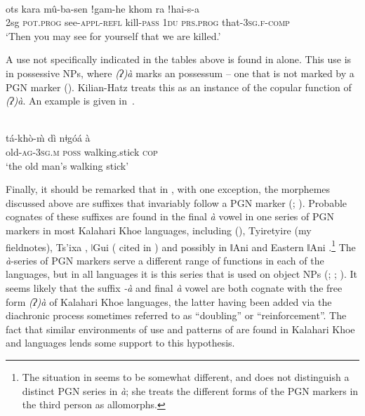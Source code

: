 \documentclass[output=paper]{LSP/langsci}
\begin{document}
\begin{exe}
\ex\label{09-mc-ex:18}
\\
\gll ots kara mû-ba-sen ǃgam-he khom ra ǃhai-s-a\\
2sg \textsc{pot}.\textsc{prog} see-\textsc{appl}-\textsc{refl} kill-\textsc{pass} 1\textsc{du} \textsc{prs}.\textsc{prog} that-3\textsc{sg.f}-\textsc{comp}\\
\glt ‘Then you may see for yourself that we are killed.’ 
\end{exe}

A use not specifically indicated in the tables above is found in  alone. This use is in possessive NPs, where \textit{(ʔ)à} marks an  possessum – \ie one that is not marked by a PGN marker (\citealt[70, 73]{Kilian-Hatz2008Grammar}). Kilian-Hatz treats this as an instance of the copular function of \textit{(ʔ)à}. An example is given in~.

\ea{}\\
\label{09-mc-ex:19} 
\gll tá-khò-\`{m} dì nǂgóá à\\
old-\textsc{ag}-3\textsc{sg.m} \textsc{poss} walking.stick \textsc{cop}\\
\glt ‘the old man’s walking stick’
\z

Finally, it should be remarked that in , with one exception, the morphemes discussed above are suffixes that invariably follow a PGN marker (\citealt[33–34]{Hagman1973Nama}; \citealt[341]{Haacke2013Gora}). Probable cognates of these suffixes are found in the final \textit{à} vowel in one series of PGN markers in most Kalahari Khoe languages, including  (\citealt[49]{McGregor2014Numerals}), Tyiretyire (my fieldnotes), Ts’ixa \citep[62–64]{Fehn2014Grammar}, ǀGui (\citealt{Nakagawa1993Preliminary} cited in \citealt[315]{Fehn2014Grammar}) and possibly in ǁAni \citep[26–28]{Heine1999Ani} and Eastern ǁAni \citep[315]{Fehn2014Grammar}.\footnote{The situation in  seems to be somewhat different, and \citet[40–41]{Kilian-Hatz2008Grammar} does not distinguish a distinct PGN series in \textit{à}; she treats the different forms of the PGN markers in the third person as allomorphs.} The \textit{à}-series of PGN markers serve a different range of functions in each of the languages, but in all languages it is this series that is used on object NPs (\citealt[40–41]{Kilian-Hatz2008Grammar}; \citealt[49]{McGregor2014Numerals}; \citealt[228, 315]{Fehn2014Grammar}). It seems likely that the suffix \textit{-à} and final \textit{à} vowel are both cognate with the free form \textit{(ʔ)à} of Kalahari Khoe languages, the latter having been added via the diachronic process sometimes referred to as “doubling” or “reinforcement”. The fact that similar environments of use and patterns of  are found in Kalahari Khoe and  languages lends some support to this hypothesis.
\end{document}
